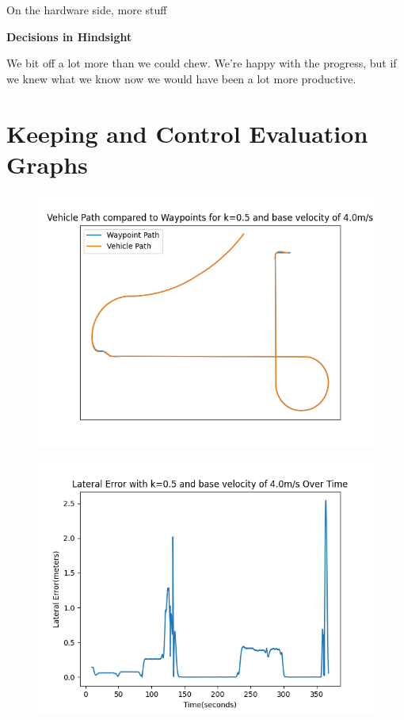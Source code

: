 \documentclass[titlepage,draft]{article}
\begin{document}
{On the hardware side, more stuff

\textbf{Decisions in Hindsight}

We bit off a lot more than we could chew. We're happy with the progress, but if we knew what we know now we would have been a lot more productive.

\printbibliography
\vspace{12pt}

\appendix

\section{Keeping and Control Evaluation Graphs}
\label{FirstAppendix}

\begin{figure}[H]
	\centering
	\begin{minipage}{.45\textwidth}
		\centering
		\includegraphics[width=\linewidth]{waypoints_k-05_v-4.png}
		\label{fig:wayk5v4}
	\end{minipage}%
	\hspace{0.1\textwidth}%
	\begin{minipage}{.45\textwidth}
		\centering
		\includegraphics[width=\linewidth]{lateral_k-05_v-4.png}

\end{minipage}
\end{figure}}
\end{document}
